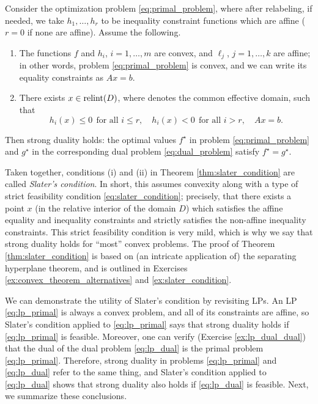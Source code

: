 \begin{Theorem}
\label{thm:slater_condition}
Consider the optimization problem \eqref{eq:primal_problem}, where after 
relabeling, if needed, we take $h_1, \dots, h_r$ to be inequality constraint
functions which are affine ($r = 0$ if none are affine). Assume the following.         

\begin{enumerate}[label=(\roman*)]
\item The functions $f$ and $h_i$, $i=1,\dots,m$ are convex, and $\ell_j$,
  $j=1,\dots,k$ are affine; in other words, problem \eqref{eq:primal_problem} is
  convex, and we can write its equality constraints as $Ax = b$.      

\item There exists $x \in \operatorname{relint}(D)$, where  denotes the common effective domain, such that      
  \begin{equation}
  \label{eq:slater_condition}
  h_i(x) \leq 0 \;\, \text{for all $i \leq r$}, \quad
  h_i(x) < 0 \;\, \text{for all $i > r$}, \quad Ax = b. 
  \end{equation}
\end{enumerate}

Then strong duality holds: the optimal values $f^\star$ in problem
\eqref{eq:primal_problem} and $g^\star$ in the corresponding dual problem  
\eqref{eq:dual_problem} satisfy $f^\star = g^\star$. 
\end{Theorem}

Taken together, conditions (i) and (ii) in Theorem \ref{thm:slater_condition}
are called \emph{Slater's condition}. In short, this assumes convexity along  
with a type of strict feasibility condition \eqref{eq:slater_condition};
precisely, that there exists a point $x$ (in the relative interior of the domain
$D$) which  
satisfies the affine equality and inequality constraints and strictly satisfies  
the non-affine inequality constraints. This strict feasibility condition is very
mild, which is why we say that strong duality holds for ``most'' convex
problems. The proof of Theorem \ref{thm:slater_condition} is based on (an 
intricate application of) the separating hyperplane theorem, and is outlined in 
Exercises \ref{ex:convex_theorem_alternatives} and \ref{ex:slater_condition}.    

We can demonstrate the utility of Slater's condition by revisiting LPs. An LP
\eqref{eq:lp_primal} is always a convex problem, and all of its constraints are
affine, so Slater's condition applied to \eqref{eq:lp_primal} says that strong
duality holds if \eqref{eq:lp_primal} is feasible. Moreover, one can verify
(Exercise \ref{ex:lp_dual_dual}) that the dual of the dual problem
\eqref{eq:lp_dual} is the primal problem \eqref{eq:lp_primal}. Therefore, strong
duality in problems \eqref{eq:lp_primal} and \eqref{eq:lp_dual} refer to the
same thing, and Slater's condition applied to \eqref{eq:lp_dual} shows that
strong duality also holds if \eqref{eq:lp_dual} is feasible. Next, we summarize
these conclusions.  

